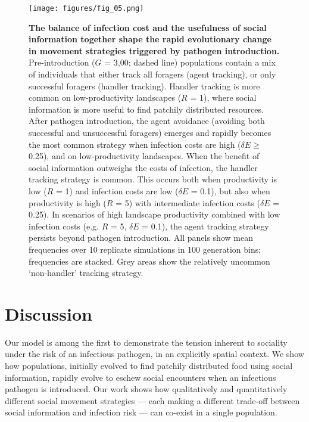 \begin{figure}[!h]
    \centering
    \texttt{[image: figures/fig\_05.png]}
    \caption{
        \textbf{The balance of infection cost and the usefulness of social information together shape the rapid evolutionary change in movement strategies triggered by pathogen introduction.}
        Pre-introduction ($G$ = 3,00; dashed line) populations contain a mix of individuals that either track all foragers (agent tracking), or only successful foragers (handler tracking).
        Handler tracking is more common on low-productivity landscapes ($R$ = 1), where social information is more useful to find patchily distributed resources.
        After pathogen introduction, the agent avoidance (avoiding both successful and unsuccessful foragers) emerges and rapidly becomes the most common strategy when infection costs are high ($\delta E \geq$ 0.25), and on low-productivity landscapes.
        When the benefit of social information outweighs the costs of infection, the handler tracking strategy is common.
        This occurs both when productivity is low ($R$ = 1) and infection costs are low ($\delta E$ = 0.1), but also when productivity is high ($R$ = 5) with intermediate infection costs ($\delta E$ = 0.25).
        In scenarios of high landscape productivity combined with low infection costs (e.g. $R$ = 5, $\delta E$ = 0.1), the agent tracking strategy persists beyond pathogen introduction.
        All panels show mean frequencies over 10 replicate simulations in 100 generation bins; frequencies are stacked.
        Grey areas show the relatively uncommon `non-handler' tracking strategy.
    }\label{fig5}
\end{figure}

\section*{Discussion}

Our model is among the first to demonstrate the tension inherent to sociality under the risk of an infectious pathogen, in an explicitly spatial context.
We show how populations, initially evolved to find patchily distributed food using social information, rapidly evolve to eschew social encounters when an infectious pathogen is introduced.
Our work shows how qualitatively and quantitatively different social movement strategies --- each making a different trade-off between social information and infection risk --- can co-exist in a single population.

